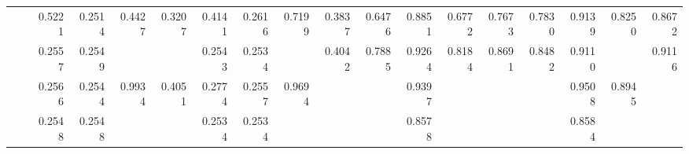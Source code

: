 {\begin{table*}[t]
{\begin{tabular}{|l|l|r|r|r|r|r|r|r|r|r|r|r|r|r|r|r|r|}
				&\AQDGNN    & 0.5221 & 0.2514 & 0.4427 & 0.3207 & 0.4141 & 0.2616 & 0.7199 & 0.3837 & 0.6476 & 0.8851 & 0.6772 & 0.7673 & 0.7830 & 0.9139 & 0.8250 & 0.8672 \\\cline{2-18}
				&\CGNPIP    & 0.2557 & 0.2549 & \cellcolor{LightCyan}{0.9991} & \cellcolor{LightRed}{0.4062} & 0.2543 & 0.2534 & \cellcolor{LightCyan}{0.9983} & 0.4042 & 0.7885 & 0.9264 & 0.8184 & 0.8691 & 0.8482 & 0.9110 & \cellcolor{LightCyan}{0.9122} & 0.9116 \\
				&\CGNPMLP   & 0.2566 & 0.2544 & 0.9934 & 0.4051 & 0.2774 & 0.2557 & 0.9694 & \cellcolor{LightRed}{0.4047} & \cellcolor{LightCyan}{0.8229} & 0.9397 & \cellcolor{LightCyan}{0.8479} & \cellcolor{LightCyan}{0.8915} & \cellcolor{LightRed}{0.8697} & 0.9508 & 0.8945 & \cellcolor{LightRed}{0.9218} \\
				&\CGNPGNN   & 0.2548 & 0.2548 & \cellcolor{LightRed}{1.0000} & \cellcolor{LightCyan}{0.4061} & 0.2534 & 0.2534 & \cellcolor{LightRed}{1.0000} & \cellcolor{LightCyan}{0.4043} & \cellcolor{LightRed}{0.8578} & 0.8578 & \cellcolor{LightRed}{1.0000} & \cellcolor{LightRed}{0.9235} & \cellcolor{LightCyan}{0.8584} &0.8584  & \cellcolor{LightRed}{1.0000} & \cellcolor{LightCyan}{0.9238}\\\hline\hline
				

\end{tabular}}
\end{table*}}
